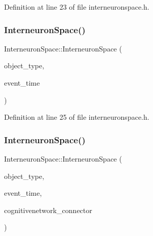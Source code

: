 Definition at line 23 of file interneuronspace.\+h.

\mbox{\label{class_interneuron_space_a753903f3c74415922607846040ac50a6}} 
\subsubsection{\texorpdfstring{Interneuron\+Space()}{InterneuronSpace()}\hspace{0.1cm}{\footnotesize\ttfamily [3/4]}}
{\footnotesize\ttfamily Interneuron\+Space\+::\+Interneuron\+Space (\begin{DoxyParamCaption}\item[{unsigned int}]{object\+\_\+type,  }\item[{std\+::chrono\+::time\+\_\+point$<$ \hyperlink{universe_8h_a0ef8d951d1ca5ab3cfaf7ab4c7a6fd80}{Clock} $>$}]{event\+\_\+time }\end{DoxyParamCaption})\hspace{0.3cm}{\ttfamily [inline]}}



Definition at line 25 of file interneuronspace.\+h.

\mbox{\label{class_interneuron_space_aa87eb8c7186542989fccdadc594c5915}} 
\subsubsection{\texorpdfstring{Interneuron\+Space()}{InterneuronSpace()}\hspace{0.1cm}{\footnotesize\ttfamily [4/4]}}
{\footnotesize\ttfamily Interneuron\+Space\+::\+Interneuron\+Space (\begin{DoxyParamCaption}\item[{unsigned int}]{object\+\_\+type,  }\item[{std\+::chrono\+::time\+\_\+point$<$ \hyperlink{universe_8h_a0ef8d951d1ca5ab3cfaf7ab4c7a6fd80}{Clock} $>$}]{event\+\_\+time,  }\item[{\hyperlink{class_cognitive_network}{Cognitive\+Network} \&}]{cognitivenetwork\+\_\+connector }\end{DoxyParamCaption})\hspace{0.3cm}{\ttfamily [inline]}}



